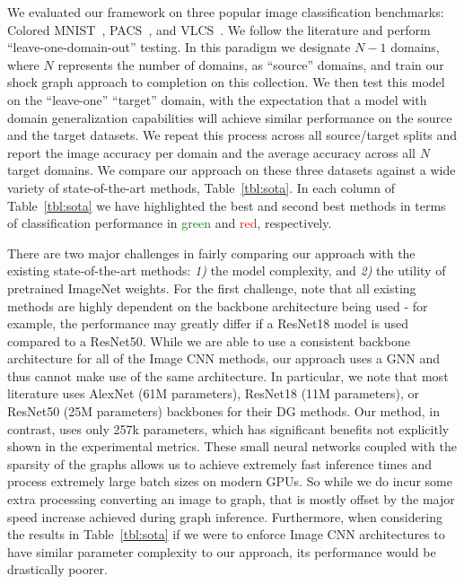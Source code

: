 We evaluated our framework on three popular image classification benchmarks: Colored MNIST~\cite{Arjovsky:etal:ARXIV20, Gulrajani:etal:ARXIV20}, PACS~\cite{Li:etal:ICCV17}, and VLCS~\cite{Fang:etal:ICCV13}. We follow the literature and perform ``leave-one-domain-out'' testing. In this paradigm we designate $N-1$ domains, where $N$ represents the number of domains, as ``source'' domains, and train our shock graph approach to completion on this collection. We then test this model on the ``leave-one'' ``target'' domain, with the expectation that a model with domain generalization capabilities will achieve similar performance on the source and the target datasets. We repeat this process across all source/target splits and report the image accuracy per domain and the average accuracy across all $N$ target domains. We compare our approach on these three datasets against a wide variety of state-of-the-art methods, Table~\ref{tbl:sota}. In each column of Table~\ref{tbl:sota} we have highlighted the best and second best methods in terms of classification performance in \textcolor{green}{green} and \textcolor{red}{red}, respectively. 


There are two major challenges in fairly comparing our approach with the existing state-of-the-art methods: \emph{1)} the model complexity, and \emph{2)} the utility of pretrained ImageNet weights. For the first challenge, note that all existing methods are highly dependent on the backbone architecture being used - for example, the performance may greatly differ if a ResNet18 model is used compared to a ResNet50. While we are able to use a consistent backbone architecture for all of the Image CNN methods, our approach uses a GNN and thus cannot make use of the same architecture.  In particular, we note that most literature uses AlexNet (61M parameters), ResNet18 (11M parameters), or ResNet50 (25M parameters) backbones for their DG methods. Our method, in contrast, uses only 257k parameters, which has significant benefits not explicitly shown in the experimental metrics. These small neural networks coupled with the sparsity of the graphs allows us to achieve extremely fast inference times and process extremely large batch sizes on modern GPUs. So while we do incur some extra processing converting an image to graph, that is mostly offset by the major speed increase achieved during graph inference. Furthermore, when considering the results in Table~\ref{tbl:sota} if we were to enforce Image CNN architectures to have similar parameter complexity to our approach, its performance would be drastically poorer. 

